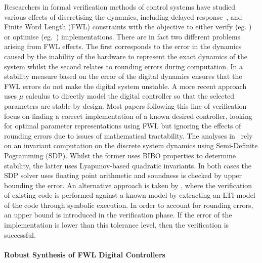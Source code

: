\documentclass{sig-alternate-05-2015}
\begin{document}
Researchers in formal verification methods of control systems have studied
various effects of discretising the dynamics, including delayed
response~\cite{Duggirala2015}, and Finite Word Length (FWL) constraints with
the objective to either verify (eg.  \cite{daes20161}) or optimise
(eg.~\cite{oudjida2014design}) implementations.  There are in fact two
different problems arising from FWL effects.  The first corresponds to the
error in the dynamics caused by the inability of the hardware to represent
the exact dynamics of the system whilst the second relates to rounding
errors during computation.  In \cite{fialho1994stability} a stability
measure based on the error of the digital dynamics ensures that the FWL
errors do not make the digital system unstable.  A more recent
approach~\cite{DBLP:journals/automatica/WuLCC09} uses $\mu$ calculus to
directly model the digital controller so that the selected parameters are
stable by design.  Most papers following this line of verification focus on
finding a correct implementation of a known desired controller, looking for
optimal parameter representations using FWL but ignoring the effects of
rounding errors due to issues of mathematical tractability.  The analyses
in~\cite{DBLP:conf/hybrid/WangGRJF16,DBLP:conf/hybrid/RouxJG15} rely on an
invariant computation on the discrete system dynamics using Semi-Definite
Pogramming (SDP).  Whilst the former uses BIBO properties to determine
stability, the latter uses Lyapunov-based quadratic invariants.  In both
cases the SDP solver uses floating point arithmetic and soundness is checked
by upper bounding the error.
An alternative approach is taken by \cite{park2016scalable}, where the verification of existing
code is performed against a known model by extracting an LTI model of the
code through symbolic execution. In order to account for rounding errors, an
upper bound is introduced in the verification phase. If the error of the implementation
is lower than this tolerance level, then the verification is successful. 

\paragraph{Robust Synthesis of FWL Digital Controllers}
\end{document}

